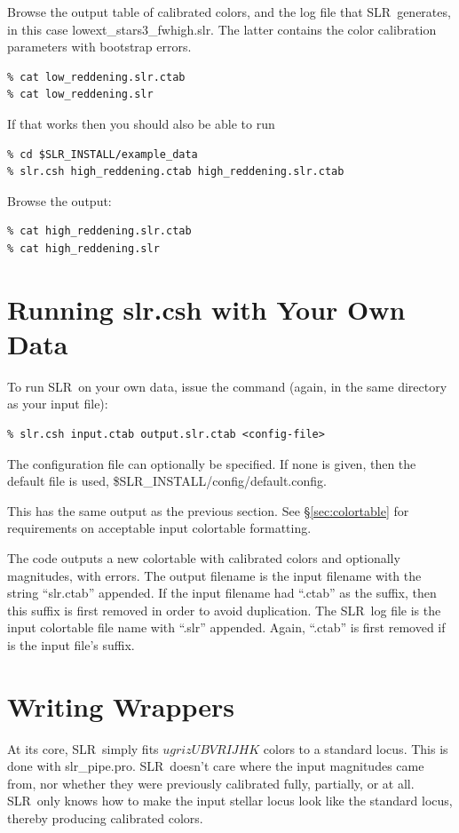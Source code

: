 \documentclass{report}
\newcommand{\slr}{SLR}
\begin{document}
Browse the output table of calibrated colors, and the log file that
\slr\ generates, in this case lowext\_stars3\_fwhigh.slr. The latter
contains the color calibration parameters with bootstrap errors.
\begin{verbatim}
% cat low_reddening.slr.ctab
% cat low_reddening.slr
\end{verbatim}

If that works then you should also be able to run
\begin{verbatim}
% cd $SLR_INSTALL/example_data
% slr.csh high_reddening.ctab high_reddening.slr.ctab
\end{verbatim}
Browse the output:
\begin{verbatim}
% cat high_reddening.slr.ctab
% cat high_reddening.slr
\end{verbatim}


\section{Running slr.csh with Your Own Data}

To run \slr\ on your own data, issue the command (again, in the same
directory as your input file):
\begin{verbatim}
% slr.csh input.ctab output.slr.ctab <config-file>
\end{verbatim}
The configuration file can optionally be specified.  If none is given,
then the default file is used, \$SLR\_INSTALL/config/default.config.

This has the same output as the previous section.  See
\S\ref{sec:colortable} for requirements on acceptable input colortable
formatting.

The code outputs a new colortable with calibrated colors and
optionally magnitudes, with errors.  The output filename is the input
filename with the string ``slr.ctab'' appended.  If the input filename
had ``.ctab'' as the suffix, then this suffix is first removed in
order to avoid duplication.  The \slr\ log file is the input
colortable file name with ``.slr'' appended.  Again, ``.ctab'' is
first removed if is the input file's suffix.


\section{Writing Wrappers}


At its core, \slr\ simply fits $ugrizUBVRIJHK$ colors to a standard
locus. This is done with slr\_pipe.pro.  \slr\ doesn't care where the
input magnitudes came from, nor whether they were previously
calibrated fully, partially, or at all.  \slr\ only knows how to make
the input stellar locus look like the standard locus, thereby
producing calibrated colors.
\end{document}
